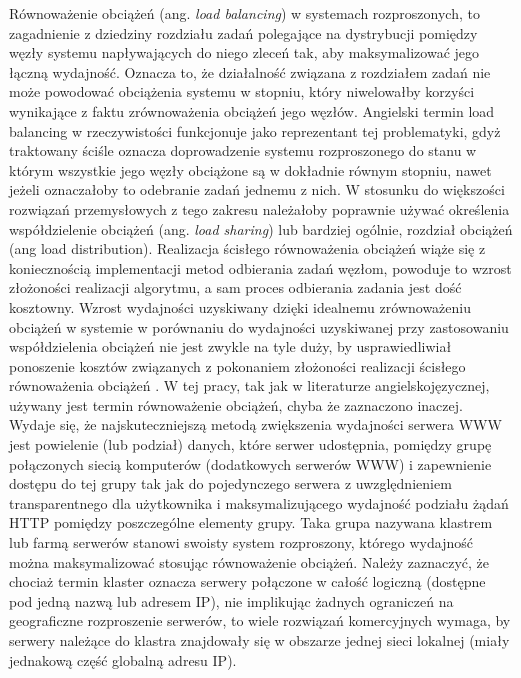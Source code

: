 Równoważenie obciążeń (ang. \emph{load balancing}) w systemach rozproszonych, to zagadnienie z dziedziny 
rozdziału zadań polegające na dystrybucji pomiędzy węzły systemu napływających do niego zleceń tak, aby  
maksymalizować jego łączną wydajność. Oznacza to, że działalność związana z rozdziałem zadań nie może powodować 
obciążenia systemu w stopniu, który niwelowałby korzyści wynikające z faktu zrównoważenia obciążeń jego węzłów. 
Angielski termin load balancing w rzeczywistości funkcjonuje jako reprezentant tej problematyki, gdyż traktowany 
ściśle oznacza doprowadzenie systemu rozproszonego do stanu w którym wszystkie jego węzły obciążone są w 
dokładnie równym stopniu, nawet jeżeli oznaczałoby to odebranie zadań jednemu z nich. W stosunku do większości 
rozwiązań przemysłowych z tego zakresu należałoby poprawnie używać określenia współdzielenie obciążeń (ang. \emph{
load sharing}) lub bardziej ogólnie, rozdział obciążeń (ang load distribution). Realizacja ścisłego równoważenia 
obciążeń wiąże się z koniecznością implementacji metod odbierania zadań węzłom, powoduje to wzrost złożoności 
realizacji algorytmu, a sam proces odbierania zadania jest dość kosztowny. Wzrost wydajności uzyskiwany dzięki 
idealnemu zrównoważeniu obciążeń w systemie w porównaniu do wydajności uzyskiwanej przy zastosowaniu 
współdzielenia obciążeń nie jest zwykle na tyle duży, by usprawiedliwiał ponoszenie kosztów związanych z 
pokonaniem złożoności realizacji ścisłego równoważenia obciążeń \cite{barylo13,barylo16,barylo17}. W tej pracy, tak jak w 
literaturze angielskojęzycznej, używany jest termin równoważenie obciążeń, chyba że zaznaczono inaczej.
Wydaje się, że najskuteczniejszą metodą zwiększenia wydajności serwera WWW jest powielenie (lub podział) danych, które 
serwer 
udostępnia, pomiędzy grupę połączonych siecią komputerów (dodatkowych serwerów WWW) i zapewnienie dostępu do 
tej grupy tak jak do pojedynczego serwera z uwzględnieniem transparentnego dla użytkownika i maksymalizującego 
wydajność podziału żądań HTTP pomiędzy poszczególne elementy grupy. Taka grupa nazywana klastrem lub farmą 
serwerów stanowi swoisty system rozproszony, którego wydajność można maksymalizować stosując równoważenie 
obciążeń. Należy zaznaczyć, że chociaż termin klaster oznacza serwery połączone w całość logiczną (dostępne pod 
jedną nazwą lub adresem IP), nie implikując żadnych ograniczeń na geograficzne rozproszenie serwerów, to wiele 
rozwiązań komercyjnych wymaga, by serwery należące do klastra znajdowały się w obszarze jednej sieci lokalnej 
(miały jednakową część globalną adresu IP).


